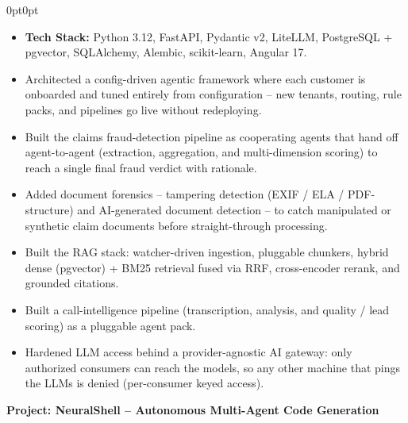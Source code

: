 \documentclass[10pt, letterpaper]{article}
\newenvironment{onecolentry}{
    \begin{adjustwidth}{0pt}{0pt}
}{
    \end{adjustwidth}
}
\newenvironment{highlights}{
    \begin{itemize}[topsep=2pt, parsep=0pt, partopsep=0pt, itemsep=2pt, leftmargin=0.8cm]
}{
    \end{itemize}
}
\newcommand{\headerrow}[2]{%
    \noindent\textbf{#1}\hfill #2\par%
}
\begin{document}
\vspace{-2pt}
\begin{onecolentry}
\begin{highlights}
    \item \textbf{Tech Stack:} Python 3.12, FastAPI, Pydantic v2, LiteLLM, PostgreSQL + pgvector, SQLAlchemy, Alembic, scikit-learn, Angular 17.
    \item Architected a config-driven agentic framework where each customer is onboarded and tuned entirely from configuration -- new tenants, routing, rule packs, and pipelines go live without redeploying.
    \item Built the claims fraud-detection pipeline as cooperating agents that hand off agent-to-agent (extraction, aggregation, and multi-dimension scoring) to reach a single final fraud verdict with rationale.
    \item Added document forensics -- tampering detection (EXIF / ELA / PDF-structure) and AI-generated document detection -- to catch manipulated or synthetic claim documents before straight-through processing.
    \item Built the RAG stack: watcher-driven ingestion, pluggable chunkers, hybrid dense (pgvector) + BM25 retrieval fused via RRF, cross-encoder rerank, and grounded citations.
    \item Built a call-intelligence pipeline (transcription, analysis, and quality / lead scoring) as a pluggable agent pack.
    \item Hardened LLM access behind a provider-agnostic AI gateway: only authorized consumers can reach the models, so any other machine that pings the LLMs is denied (per-consumer keyed access).
\end{highlights}
\end{onecolentry}

\vspace{6pt}
\headerrow{Project: NeuralShell -- Autonomous Multi-Agent Code Generation}{}
\end{document}
